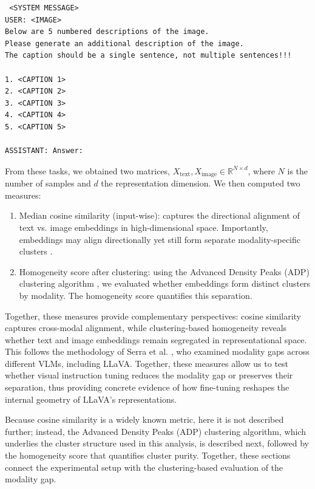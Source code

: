 \begin{verbatim} <SYSTEM MESSAGE>
USER: <IMAGE>
Below are 5 numbered descriptions of the image.
Please generate an additional description of the image.
The caption should be a single sentence, not multiple sentences!!!

1. <CAPTION 1>
2. <CAPTION 2>
3. <CAPTION 3>
4. <CAPTION 4>
5. <CAPTION 5>

ASSISTANT: Answer:
\end{verbatim}

From these tasks, we obtained two matrices, $X_{\text{text}}, X_{\text{image}} \in \mathbb{R}^{N \times d}$, where $N$ is the number of samples and $d$ the representation dimension. We then computed two measures:

\begin{enumerate}
    \item Median cosine similarity (input-wise): captures the directional alignment of text vs. image embeddings in high-dimensional space. Importantly, embeddings may align directionally yet still form separate modality-specific clusters \cite{liangMindGapUnderstanding2022,roleFillGapQuantifying2025}.
    \item Homogeneity score after clustering: using the Advanced Density Peaks (ADP) clustering algorithm \cite{derricoAutomaticTopographyHighdimensional2021}, we evaluated whether embeddings form distinct clusters by modality. The homogeneity score \cite{rosenbergVMeasureConditionalEntropyBased} quantifies this separation.
\end{enumerate}

Together, these measures provide complementary perspectives: cosine similarity captures cross-modal alignment, while clustering-based homogeneity reveals whether text and image embeddings remain segregated in representational space. This follows the methodology of Serra et al. \cite{serraNarrowGateLocalizeda}, who examined modality gaps across different VLMs, including LLaVA. Together, these measures allow us to test whether visual instruction tuning reduces the modality gap or preserves their separation, thus providing concrete evidence of how fine-tuning reshapes the internal geometry of LLaVA's representations.

Because cosine similarity is a widely known metric, here it is not described further; instead, the Advanced Density Peaks (ADP) clustering algorithm, which underlies the cluster structure used in this analysis, is described next, followed by the homogeneity score that quantifies cluster purity. Together, these sections connect the experimental setup with the clustering-based evaluation of the modality gap.

